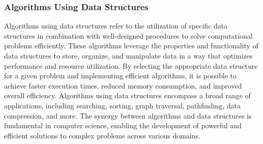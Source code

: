 \subsubsection*{Algorithms Using Data Structures}

Algorithms using data structures refer to the utilization of specific data structures in combination with well-designed procedures to solve computational problems efficiently. These algorithms leverage the properties and functionality of data structures to store, organize, and manipulate data in a way that optimizes performance and resource utilization. By selecting the appropriate data structure for a given problem and implementing efficient 
algorithms, it is possible to achieve faster execution times, reduced memory consumption, and improved overall efficiency. Algorithms using data structures encompass a broad range of applications, including searching, sorting, graph traversal, pathfinding, data compression, and more. The synergy between algorithms and data structures is fundamental in computer science, enabling the development of powerful and efficient solutions to complex 
problems across various domains. \\

